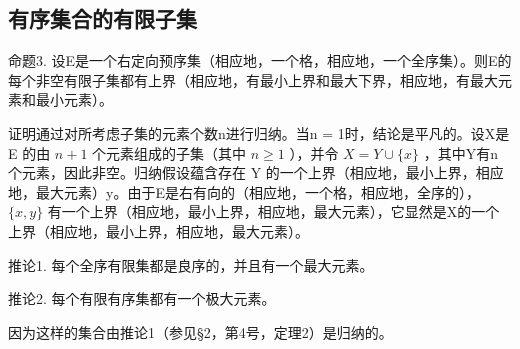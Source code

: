 \subsection{有序集合的有限子集}

命题3. 设E是一个右定向预序集（相应地，一个格，相应地，一个全序集）。则E的每个非空有限子集都有上界（相应地，有最小上界和最大下界，相应地，有最大元素和最小元素）。

证明通过对所考虑子集的元素个数n进行归纳。当n = 1时，结论是平凡的。设X是 E 的由 \(n + 1\) 个元素组成的子集（其中 \(n \geqslant 1\) ），并令 \(X = Y \cup \{x\}\) ，其中Y有n个元素，因此非空。归纳假设蕴含存在 Y 的一个上界（相应地，最小上界，相应地，最大元素）y。由于E是右有向的（相应地，一个格，相应地，全序的）， \(\{x, y\}\) 有一个上界（相应地，最小上界，相应地，最大元素），它显然是X的一个上界（相应地，最小上界，相应地，最大元素）。

推论1. 每个全序有限集都是良序的，并且有一个最大元素。

推论2. 每个有限有序集都有一个极大元素。

因为这样的集合由推论1（参见§2，第4号，定理2）是归纳的。

